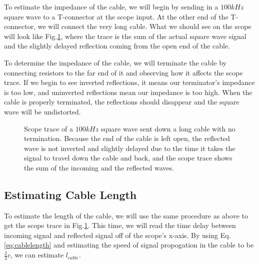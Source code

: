 \documentclass[12pt]{article}
\begin{document}
To estimate the impedance of the cable, we will begin by sending in a $100kHz$ square wave to a T-connector at the scope input. At the other end of the T-connector, we will connect the very long cable. What we should see on the scope will look like Fig.\ref{fig:reflections}, where the trace is the sum of the actual square wave signal and the slightly delayed reflection coming from the open end of the cable.

To determine the impedance of the cable, we will terminate the cable by connecting resistors to the far end of it and observing how it affects the scope trace. If we begin to see inverted reflections, it means our terminator's impedance is too low, and uninverted reflections mean our impedance is too high. When the cable is properly terminated, the reflections should disappear and the square wave will be undistorted.

\begin{figure}[H]
\caption[SODUMB]{Scope trace of a $100kHz$ square wave sent down a long cable with no termination. Because the end of the cable is left open, the reflected wave is not inverted and slightly delayed due to the time it takes the signal to travel down the cable and back, and the scope trace shows the sum of the incoming and the reflected waves.}
\label{fig:reflections}
\end{figure}

\subsection*{Estimating Cable Length}
To estimate the length of the cable, we will use the same procedure as above to get the scope trace in Fig.\ref{fig:reflections}. This time, we will read the time delay between incoming signal and reflected signal off of the scope's x-axis. By using Eq.\ref{eq:cablelength} and estimating the speed of signal propogation in the cable to be $\frac{2}{3}c$, we can estimate $l_{cable}$.
\end{document}

